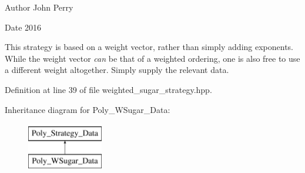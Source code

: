 \begin{DoxyAuthor}{Author}
John Perry 
\end{DoxyAuthor}
\begin{DoxyDate}{Date}
2016
\end{DoxyDate}
This strategy is based on a weight vector, rather than simply adding exponents. While the weight vector {\itshape can} be that of a weighted ordering, one is also free to use a different weight altogether. Simply supply the relevant data. 

Definition at line 39 of file weighted\+\_\+sugar\+\_\+strategy.\+hpp.

Inheritance diagram for Poly\+\_\+\+W\+Sugar\+\_\+\+Data\+:\begin{figure}[H]
\begin{center}
\leavevmode
\includegraphics[height=2.000000cm]{group__strategygroup}
\end{center}
\end{figure}
